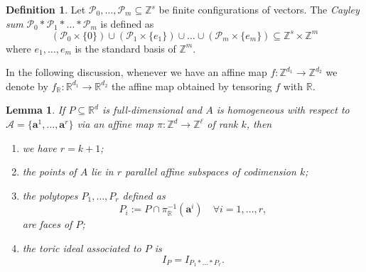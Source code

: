 \documentclass[12pt,reqno]{amsart}   	%
\theoremstyle{plain}
\newtheorem{lemma}[theorem]{Lemma}
\theoremstyle{definition}
\newtheorem{definition}[theorem]{Definition}
\theoremstyle{remark}
\newcommand{\Z}{\mathbb{Z}}
\newcommand{\R}{\mathbb{R}}
\begin{document}
\begin{definition}
    Let $\mathcal{P}_0,\dots,\mathcal{P}_m \subseteq \Z^s$ be  finite configurations of vectors. The \textit{Cayley sum} $\mathcal{P}_0 * \mathcal{P}_1 *\dots * \mathcal{P}_m$ is defined as
    \[
    \left( \mathcal{P}_0 \times \{0\} \right) \cup \left( \mathcal{P}_1 \times \{e_1\} \right) \cup \dots \cup \left( \mathcal{P}_m \times \{e_m\} \right) \subseteq \Z^s \times \Z^m
    \]
    where $e_1,\dots,e_m$ is the standard basis of $\Z^m$.
\end{definition}
In the following discussion, whenever we have an affine map $f: \Z^{d_1}\to\Z^{d_2}$ we denote by $f_{\R}:\R^{d_1}\to\R^{d_2}$ the affine map obtained by tensoring $f$ with $\R$. 
\begin{lemma} \label{lemma:CayleySum}
  If $P \subseteq \R^d$ is full-dimensional and $A$ is homogeneous with respect to $\mathcal{A} = \{\mathbf{a}^1,\dots,\mathbf{a}^r\}$ via an affine map $\pi: \Z^d \to \Z^{\ell}$ of rank $k$, then %
    \begin{enumerate}
        \item we have $r=k+1$;
        \item the points of $A$ lie in $r$ parallel affine subspaces of codimension $k$;
        \item the polytopes $P_1,\dots,P_r$ defined as 
        \[
        P_i := P \cap \pi^{-1}_{\R}(\mathbf{a}^i) \quad\forall i=1,\dots,r ,
        \]
        are faces of $P$;
        \item the toric ideal associated to $P$ is
        \[
        I_{P} = I_{P_1*\dots*P_r}.
        \]
    \end{enumerate}
\end{lemma}
\end{document}
